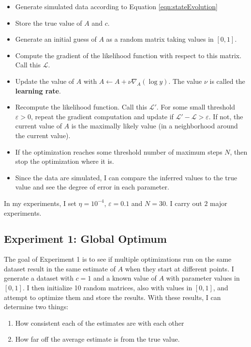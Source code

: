 \documentclass[12pt]{article}
\theoremstyle{definition}
\begin{document}
\begin{itemize}
    \item Generate simulated data according to Equation \ref{eqn:stateEvolution}
    \item Store the true value of $A$ and $c$.
    \item Generate an initial guess of $A$ as a random matrix taking values in $[0, 1]$.
    \item Compute the gradient of the likelihood function with respect to this matrix. Call this $\mathcal{L}$.
    \item Update the value of $A$ with $A \leftarrow A + \nu \nabla_A (\log y)$. The value $\nu$ is called the \textbf{learning rate}.
    \item Recompute the likelihood function. Call this $\mathcal{L}'$. For some small threshold $\varepsilon > 0$, repeat the gradient computation and update if $\mathcal{L}' - \mathcal{L} > \varepsilon$. If not, the current value of $A$ is the maximally likely value (in a neighborhood around the current value).
    \item If the optimization reaches some threshold number of maximum steps $N$, then stop the optimization where it is.
    \item Since the data are simulated, I can compare the inferred values to the true value and see the degree of error in each parameter. 
\end{itemize}

In my experiments, I set $\eta = 10^{-4}$, $\varepsilon = 0.1$ and $N = 30$. I carry out $2$ major experiments.

\subsection{Experiment 1: Global Optimum}

The goal of Experiment 1 is to see if multiple optimizations run on the same dataset result in the same estimate of $A$ when they start at different points. I generate a dataset with $c=1$ and a known value of $A$ with parameter values in $[0, 1]$. I then initialize 10 random matrices, also with values in $[0, 1]$, and attempt to optimize them and store the results. With these results, I can determine two things:

\begin{enumerate}
    \item How consistent each of the estimates are with each other
    \item How far off the average estimate is from the true value.
\end{enumerate}
\end{document}
